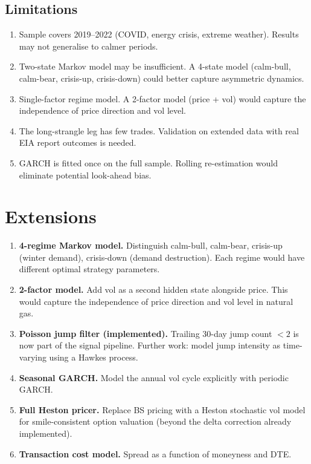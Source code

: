\documentclass[11pt,a4paper]{article}
\begin{document}
\subsection{Limitations}
\begin{enumerate}[nosep]
\item Sample covers 2019--2022 (COVID, energy crisis, extreme weather). Results may not generalise to calmer periods.
\item Two-state Markov model may be insufficient. A 4-state model (calm-bull, calm-bear, crisis-up, crisis-down) could better capture asymmetric dynamics.
\item Single-factor regime model. A 2-factor model (price + vol) would capture the independence of price direction and vol level.
\item The long-strangle leg has few trades. Validation on extended data with real EIA report outcomes is needed.
\item GARCH is fitted once on the full sample. Rolling re-estimation would eliminate potential look-ahead bias.
\end{enumerate}


\section{Extensions}

\begin{enumerate}
\item \textbf{4-regime Markov model.} Distinguish calm-bull, calm-bear, crisis-up (winter demand), crisis-down (demand destruction). Each regime would have different optimal strategy parameters.
\item \textbf{2-factor model.} Add vol as a second hidden state alongside price. This would capture the independence of price direction and vol level in natural gas.
\item \textbf{Poisson jump filter (implemented).} Trailing 30-day jump count $< 2$ is now part of the signal pipeline. Further work: model jump intensity as time-varying using a Hawkes process.
\item \textbf{Seasonal GARCH.} Model the annual vol cycle explicitly with periodic GARCH.
\item \textbf{Full Heston pricer.} Replace BS pricing with a Heston stochastic vol model for smile-consistent option valuation (beyond the delta correction already implemented).
\item \textbf{Transaction cost model.} Spread as a function of moneyness and DTE.
\end{enumerate}
\end{document}
